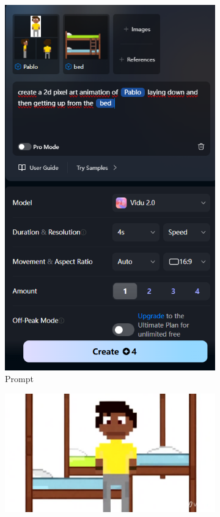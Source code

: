 \begin{figure}[htbp]
    \centering
    \caption{\small Processo da utilização 2 do Vidu em agosto/2025}
    \label{fig:vidu7}
    \begin{subfigure}{0.35\linewidth}
        \includegraphics[width=1\linewidth]{figs/vidu/tela7.PNG}
        \caption{\small Prompt}
        \label{fig:vidu7a}
    \end{subfigure}
    \begin{subfigure}{0.55\linewidth}
        \includegraphics[width=1\linewidth]{figs/vidu/frame7.jpg}

\end{subfigure}
\end{figure}
